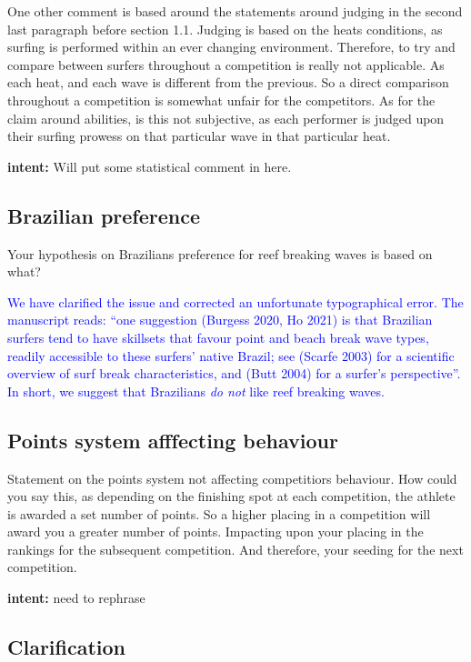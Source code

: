 \documentclass[12pt]{article}
\begin{document}
One other comment is based around the statements around judging in the
second last paragraph before section 1.1. Judging is based on the
heats conditions, as surfing is performed within an ever changing
environment. Therefore, to try and compare between surfers throughout
a competition is really not applicable. As each heat, and each wave is
different from the previous. So a direct comparison throughout a
competition is somewhat unfair for the competitors. As for the claim
around abilities, is this not subjective, as each performer is judged
upon their surfing prowess on that particular wave in that particular
heat.


{\bf intent:}  Will put some statistical comment in here.


\subsection*{Brazilian preference}


Your hypothesis on Brazilians preference for reef breaking waves is based on what? 


\textcolor{blue}{We have clarified the issue and corrected an
  unfortunate typographical error.  The manuscript reads: ``one
  suggestion (Burgess 2020, Ho 2021) is that Brazilian surfers tend to
  have skillsets that favour point and beach break wave types, readily
  accessible to these surfers' native Brazil; see (Scarfe 2003) for a
  scientific overview of surf break characteristics, and (Butt 2004)
  for a surfer's perspective''.  In short, we suggest that Brazilians
  {\em do not} like reef breaking waves.}

\subsection*{Points system afffecting behaviour}


Statement on the points system not affecting competitiors
behaviour. How could you say this, as depending on the finishing spot
at each competition, the athlete is awarded a set number of points. So
a higher placing in a competition will award you a greater number of
points. Impacting upon your placing in the rankings for the subsequent
competition. And therefore, your seeding for the next competition.



{\bf intent: } need to rephrase

\subsection*{Clarification}
\end{document}
